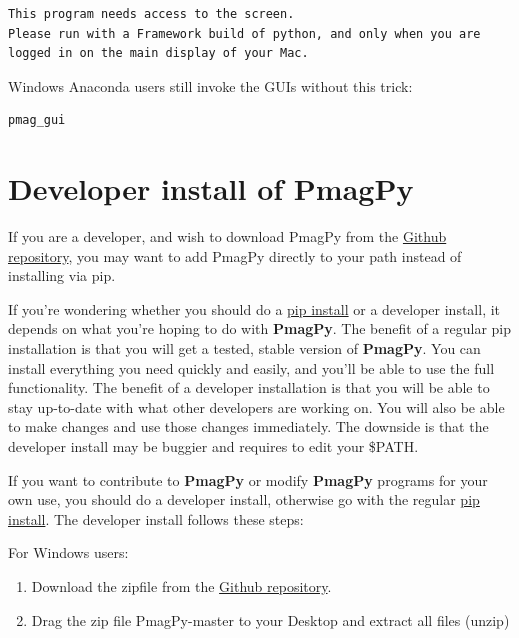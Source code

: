 \documentclass[11pt]{book}
\begin{document}
{\begin{verbatim}
This program needs access to the screen.
Please run with a Framework build of python, and only when you are
logged in on the main display of your Mac.
\end{verbatim}

\noindent Windows Anaconda users still invoke the GUIs without this trick:

\begin{verbatim}
pmag_gui
\end{verbatim}


\section{Developer install of PmagPy}

If you are a developer, and wish to download PmagPy from the \href{https://github.com/PmagPy/PmagPy}{Github repository}, you may want to add PmagPy directly to your path instead of installing via pip.

If you're wondering whether you should do a \href{#pip_install}{pip install} or a developer install, it depends on what you're hoping to do with {\bf PmagPy}.  The benefit of a regular pip installation is that you will get a tested, stable version of {\bf PmagPy}.  You can install everything you need quickly and easily, and you'll be able to use the full functionality.  The benefit of a developer installation is that you will be able to stay up-to-date with what other developers are working on.  You will also be able to make changes and use those changes immediately.  The downside is that the developer install may be buggier and requires to edit your \$PATH.

If you want to contribute to {\bf PmagPy} or modify {\bf PmagPy} programs for your own use, you should do a developer install, otherwise go with the regular \href{#pip_install}{pip install}.  The developer install follows these steps:


For Windows users:

\begin{enumerate}

\item  Download the zipfile from the \href{https://github.com/PmagPy/PmagPy}{Github repository}.

\item Drag the zip file PmagPy-master to your Desktop and extract all files (unzip)


\end{enumerate}}
\end{document}
